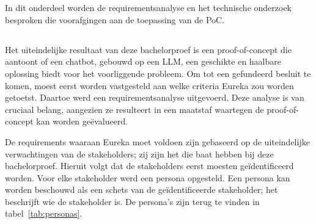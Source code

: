 \chapter{}%
\label{ch:onderzoek}

In dit onderdeel worden de requirementsanalyse en het technische onderzoek besproken die voorafgingen aan de toepassing van de PoC.

\section{}%
\label{sec:requirement-analyse}

Het uiteindelijke resultaat van deze bachelorproef is een proof-of-concept die aantoont of een chatbot, gebouwd op een \acrshort{LLM}, een geschikte en haalbare oplossing biedt voor het voorliggende probleem. Om tot een gefundeerd besluit te komen, moest eerst worden vastgesteld aan welke criteria Eureka zou worden getoetst. Daartoe werd een requirementsanalyse uitgevoerd. Deze analyse is van cruciaal belang, aangezien ze resulteert in een maatstaf waartegen de proof-of-concept kan worden geëvalueerd. 

De requirements waaraan Eureka moet voldoen zijn gebaseerd op de uiteindelijke verwachtingen van de stakeholders; zij zijn het die baat hebben bij deze bachelorproef. Hieruit volgt dat de stakeholders eerst moesten geïdentificeerd worden. Voor elke stakeholder werd een persona opgesteld. Een persona kan worden beschouwd als een schets van de geïdentificeerde stakeholder; het beschrijft wie de stakeholder is. De persona’s zijn terug te vinden in tabel~\ref{tab:personas}.


